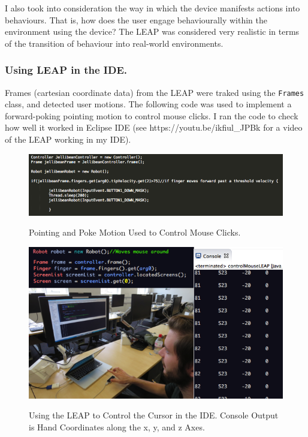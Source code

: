 \documentclass[a4paper, 11pt]{article}
\begin{document}
I also took into consideration the way in which the device manifests actions into behaviours. That is, how does the user engage behaviourally within the environment using the device? The LEAP was considered very realistic in terms of the transition of behaviour into real-world environments.

\subsubsection{Using LEAP in the IDE.}
Frames (cartesian coordinate data) from the LEAP were traked using the \texttt{Frames} class, and detected user motions. The following code was used to implement a forward-poking pointing motion to control mouse clicks. I ran the code to check how well it worked in Eclipse IDE (see https://youtu.be/ikfiul\_JPBk for a video of the LEAP working in my IDE). 

\begin{figure}[H]
\begin{center}
\includegraphics[scale=0.5]{leapCode}\\
\caption{Pointing and Poke Motion Used to Control Mouse Clicks.}
\label{leapCode}
\end{center}
\end{figure}

\begin{figure}[H]
\begin{center}
\includegraphics[scale=0.65]{Monty1}\\
\caption{Using the LEAP to Control the Cursor in the IDE. Console Output is Hand Coordinates along the x, y, and z Axes.}
\label{Monty}
\end{center}
\end{figure}
\end{document}
